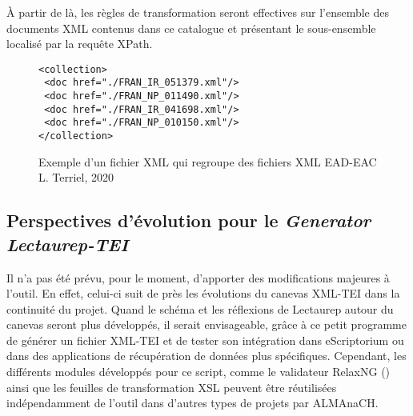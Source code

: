 À partir de là, les règles de transformation seront effectives sur l'ensemble des documents XML contenus dans ce catalogue et présentant le sous-ensemble localisé par la requête XPath.

\begin{figure}[h!]
\lstset{language=XML}
\begin{lstlisting}
<collection>
 <doc href="./FRAN_IR_051379.xml"/>
 <doc href="./FRAN_NP_011490.xml"/>
 <doc href="./FRAN_IR_041698.xml"/>
 <doc href="./FRAN_NP_010150.xml"/>
</collection>
\end{lstlisting}
\caption{Exemple d'un fichier XML  qui regroupe des fichiers XML EAD-EAC  \textcopyright L. Terriel, 2020}
\label{fig:catalogue}
\end{figure}
\newpage
\subsection{Perspectives d'évolution pour le \textit{Generator Lectaurep-TEI}}

Il n'a pas été prévu, pour le moment, d'apporter des modifications majeures à l'outil. En effet, celui-ci suit de près les évolutions du canevas XML-TEI dans la continuité du projet. Quand le schéma et les réflexions de Lectaurep autour du canevas seront plus développés, il serait envisageable, grâce à ce petit programme de générer un fichier XML-TEI et de tester son intégration dans eScriptorium ou dans des applications de récupération de données plus spécifiques. Cependant, les différents modules développés pour ce script, comme le validateur RelaxNG () ainsi que les feuilles de transformation XSL peuvent être réutilisées indépendamment de l'outil dans d'autres types de projets par ALMAnaCH.
\clearpage
\thispagestyle{empty}